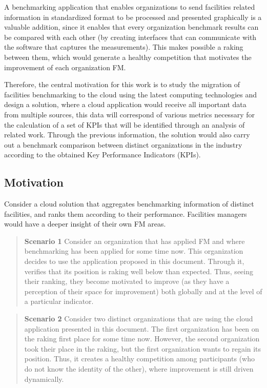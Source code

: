 A benchmarking application that enables organizations to send facilities related information in standardized format to be processed and presented graphically is a valuable addition, since it enables that every organization benchmark results can be compared with each other (by creating interfaces that can communicate with the software that captures the measurements). This makes possible a raking between them, which would generate a healthy competition that motivates the improvement of each organization FM.

Therefore, the central motivation for this work is to study the migration of facilities benchmarking to the cloud using the latest computing technologies and design a solution, where a cloud application would receive all important data from multiple sources, this data will correspond of various metrics necessary for the calculation of a set of KPIs that will be identified through an analysis of related work. Through the previous information, the solution would also carry out a benchmark comparison between distinct organizations in the industry according to the obtained Key Performance Indicators (KPIs).

\subsection{Motivation}

Consider a cloud solution that aggregates benchmarking information of distinct facilities, and ranks them according to their performance. Facilities managers would have a deeper insight of their own FM areas. 

\begin{quote}
	{\bf Scenario 1} Consider an organization that has applied FM and where benchmarking has been applied for some time now. This organization decides to use the application proposed in this document. Through it, verifies that its position is raking well below than expected. Thus, seeing their ranking, they become motivated to improve (as they have a perception of their space for improvement) both globally and at the level of a particular indicator.
\end{quote}

\begin{quote}
	{\bf Scenario 2} Consider two distinct organizations that are using the cloud application presented in this document. The first organization has been on the raking first place for some time now. However, the second organization took their place in the raking, but the first organization wants to regain its position. Thus, it creates a healthy competition among participants (who do not know the identity of the other), where improvement is still driven dynamically.
\end{quote}


